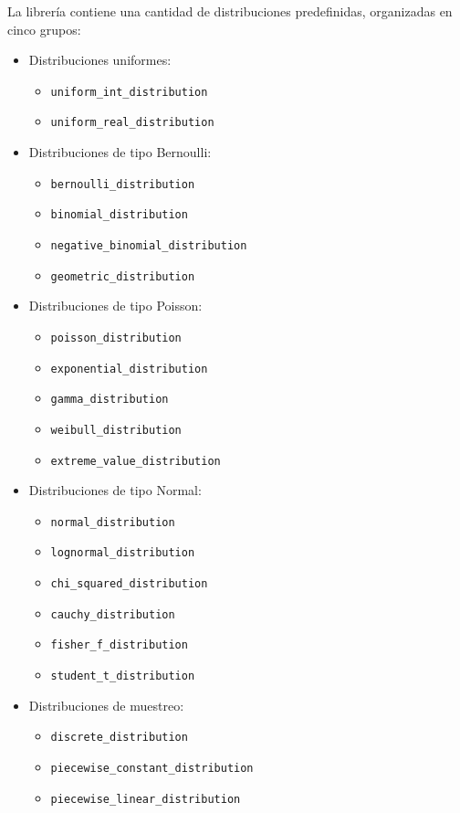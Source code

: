 \documentclass{article}
\begin{document}
La librería contiene una cantidad de distribuciones predefinidas, organizadas en cinco grupos:
\begin{itemize}
    \item Distribuciones uniformes:
    \begin{itemize}
        \item \verb#uniform_int_distribution#
        \item \verb#uniform_real_distribution#
    \end{itemize}
    \item Distribuciones de tipo Bernoulli:
    \begin{itemize}
        \item \verb#bernoulli_distribution#
        \item \verb#binomial_distribution#
        \item \verb#negative_binomial_distribution#
        \item \verb#geometric_distribution#
    \end{itemize}
    \item Distribuciones de tipo Poisson:
    \begin{itemize}
        \item \verb#poisson_distribution#
        \item \verb#exponential_distribution#
        \item \verb#gamma_distribution#
        \item \verb#weibull_distribution#
        \item \verb#extreme_value_distribution#
    \end{itemize}
    \item Distribuciones de tipo Normal:
    \begin{itemize}
        \item \verb#normal_distribution#
        \item \verb#lognormal_distribution#
        \item \verb#chi_squared_distribution#
        \item \verb#cauchy_distribution#
        \item \verb#fisher_f_distribution#
        \item \verb#student_t_distribution#
    \end{itemize}
    \item Distribuciones de muestreo:
    \begin{itemize}
        \item \verb#discrete_distribution#
        \item \verb#piecewise_constant_distribution#
        \item \verb#piecewise_linear_distribution#
    \end{itemize}
\end{itemize}
\end{document}

